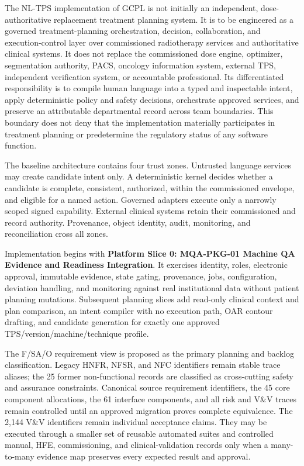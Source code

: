 \documentclass[11pt,letterpaper]{article}
\begin{document}
The NL-TPS implementation of GCPL is not initially an independent, dose-authoritative replacement treatment planning system. It is to be engineered as a governed treatment-planning orchestration, decision, collaboration, and execution-control layer over commissioned radiotherapy services and authoritative clinical systems. It does not replace the commissioned dose engine, optimizer, segmentation authority, PACS, oncology information system, external TPS, independent verification system, or accountable professional. Its differentiated responsibility is to compile human language into a typed and inspectable intent, apply deterministic policy and safety decisions, orchestrate approved services, and preserve an attributable departmental record across team boundaries. This boundary does not deny that the implementation materially participates in treatment planning or predetermine the regulatory status of any software function.

The baseline architecture contains four trust zones. Untrusted language services may create candidate intent only. A deterministic kernel decides whether a candidate is complete, consistent, authorized, within the commissioned envelope, and eligible for a named action. Governed adapters execute only a narrowly scoped signed capability. External clinical systems retain their commissioned and record authority. Provenance, object identity, audit, monitoring, and reconciliation cross all zones.

Implementation begins with \textbf{Platform Slice 0: MQA-PKG-01 Machine QA Evidence and Readiness Integration}. It exercises identity, roles, electronic approval, immutable evidence, state gating, provenance, jobs, configuration, deviation handling, and monitoring against real institutional data without patient planning mutations. Subsequent planning slices add read-only clinical context and plan comparison, an intent compiler with no execution path, OAR contour drafting, and candidate generation for exactly one approved TPS/version/machine/technique profile.

The F/SA/O requirement view is proposed as the primary planning and backlog classification. Legacy HNFR, NFSR, and NFC identifiers remain stable trace aliases; the 25 former non-functional records are classified as cross-cutting safety and assurance constraints. Canonical source requirement identifiers, the 45 core component allocations, the 61 interface components, and all risk and V\&V traces remain controlled until an approved migration proves complete equivalence. The 2,144 V\&V identifiers remain individual acceptance claims. They may be executed through a smaller set of reusable automated suites and controlled manual, HFE, commissioning, and clinical-validation records only when a many-to-many evidence map preserves every expected result and approval.
\end{document}
